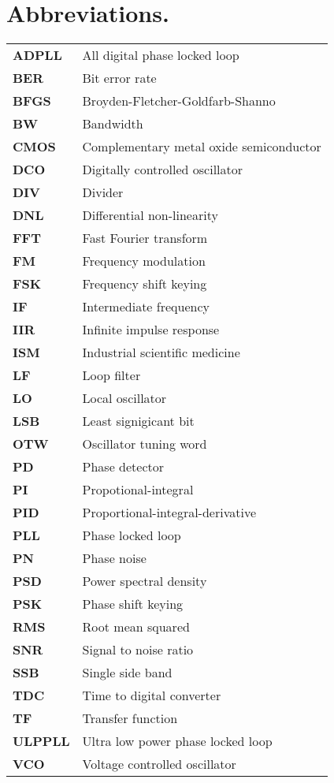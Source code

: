 \pagebreak
\null
\pagebreak
\section*{Abbreviations.}
	\begin{tabular}{@{}ll}
		\textbf{\textsf{ADPLL}}	&	All digital phase locked loop \\
		\textbf{\textsf{BER}}	&	Bit error rate \\
		\textbf{\textsf{BFGS}}	&	Broyden-Fletcher-Goldfarb-Shanno \\
		\textbf{\textsf{BW}}	&	Bandwidth \\
		\textbf{\textsf{CMOS}}	&	Complementary metal oxide semiconductor \\
		\textbf{\textsf{DCO}}	&	Digitally controlled oscillator \\
		\textbf{\textsf{DIV}}	&	Divider \\
		\textbf{\textsf{DNL}}	&	Differential non-linearity \\
		\textbf{\textsf{FFT}}	&	Fast Fourier transform \\
		\textbf{\textsf{FM}}	&	Frequency modulation \\
		\textbf{\textsf{FSK}}	&	Frequency shift keying \\
		\textbf{\textsf{IF}}	&	Intermediate frequency \\
		\textbf{\textsf{IIR}}	&	Infinite impulse response \\
		\textbf{\textsf{ISM}}	&	Industrial scientific medicine \\
		\textbf{\textsf{LF}}	&	Loop filter \\
		\textbf{\textsf{LO}}	&	Local oscillator \\
		\textbf{\textsf{LSB}}	&	Least signigicant bit \\
		\textbf{\textsf{OTW}}	&	Oscillator tuning word \\
		\textbf{\textsf{PD}}	&	Phase detector \\
		\textbf{\textsf{PI}}	&	Propotional-integral \\
		\textbf{\textsf{PID}}	&	Proportional-integral-derivative \\
		\textbf{\textsf{PLL}}	&	Phase locked loop \\
		\textbf{\textsf{PN}}	&	Phase noise \\
		\textbf{\textsf{PSD}}	&	Power spectral density \\
		\textbf{\textsf{PSK}}	&	Phase shift keying \\
		\textbf{\textsf{RMS}}	&	Root mean squared \\
		\textbf{\textsf{SNR}}	&	Signal to noise ratio \\
		\textbf{\textsf{SSB}}	&	Single side band \\
		\textbf{\textsf{TDC}}	&	Time to digital converter \\
		\textbf{\textsf{TF}}	&	Transfer function \\
		\textbf{\textsf{ULPPLL}}	&	Ultra low power phase locked loop \\
		\textbf{\textsf{VCO}}	&	Voltage controlled oscillator \\
	\end{tabular}
